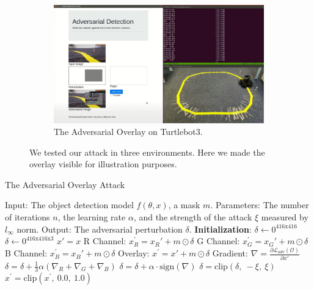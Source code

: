\begin{figure}[b]
\begin{subfigure}[b]{0.31\textwidth}
    \centering
    \includegraphics[width=\textwidth]{figures/chapter_detection/turtlebot.jpg}
    \caption{The Adversarial Overlay on Turtlebot3.}
    \label{fig:turtlebot}
\end{subfigure}
\caption{We tested our attack in three environments. Here we made the overlay visible for illustration purposes.}
\label{fig.adv_detect_demo}
\end{figure}

\begin{algorithm}[t]
    \caption{The Adversarial Overlay Attack}\label{alg:adv-overlay}
    \begin{algorithmic}
        \STATE Input: The object detection model $f(\theta, x)$, a mask $m$.
        \STATE Parameters: The number of iterations $n$, the learning rate $\alpha$, and the strength of the attack $\xi$ measured by $l_{\infty}$ norm.
        \STATE Output: The adversarial perturbation $\delta$.
        \STATE \textbf{Initialization}: 
            \STATE $\delta \leftarrow 0^{416\text{x}416}$
        \ELSE
            \STATE $\delta \leftarrow 0^{416\text{x}416\text{x}3}$
        \ENDIF
            \STATE $x' = x$
                \STATE R Channel: $x_R^{'} = x_R' + m \odot \delta$
                \STATE G Channel: $x_G^{'} = x_G' + m \odot \delta$
                \STATE B Channel: $x_B^{'} = x_B' + m \odot \delta$
                \ELSE
                    \STATE Overlay: $x^{'} = x' + m \odot \delta$
                \ENDIF
                \STATE Gradient: $\nabla = \frac{\partial \mathcal{L}_{adv}(\mathcal{O})}{\partial x'}$
                    \STATE $\delta = \delta +  \frac{1}{3}\alpha(\nabla_R + \nabla_G + \nabla_B) $
                \ELSE
                    \STATE $\delta = \delta + \alpha \cdot \text{sign}(\nabla)$
                \ENDIF
                \STATE $\delta = \text{clip}(\delta,\ -\xi,\ \xi)$
                \STATE $x^{'} = \text{clip}(x^{'},\ 0.0,\ 1.0)$
            \ENDFOR
        \ENDFOR
    \end{algorithmic}
\end{algorithm}

